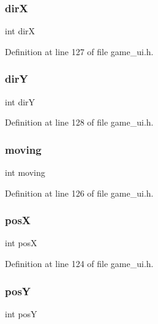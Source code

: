 \subsubsection{\texorpdfstring{dirX}{dirX}}
{\footnotesize\ttfamily int dirX}



Definition at line 127 of file game\+\_\+ui.\+h.

\mbox{\label{structball__t_aaa2cc03cc9f201b80d903336a92173a9}} 
\subsubsection{\texorpdfstring{dirY}{dirY}}
{\footnotesize\ttfamily int dirY}



Definition at line 128 of file game\+\_\+ui.\+h.

\mbox{\label{structball__t_ad892143587536d5edaac114b6d9b38f6}} 
\subsubsection{\texorpdfstring{moving}{moving}}
{\footnotesize\ttfamily int moving}



Definition at line 126 of file game\+\_\+ui.\+h.

\mbox{\label{structball__t_ab34f89ef94db9dd6d3a04425dd6d9c9d}} 
\subsubsection{\texorpdfstring{posX}{posX}}
{\footnotesize\ttfamily int posX}



Definition at line 124 of file game\+\_\+ui.\+h.

\mbox{\label{structball__t_a65ab2de052c17234c8a1db3fd3b868a9}} 
\subsubsection{\texorpdfstring{posY}{posY}}
{\footnotesize\ttfamily int posY}




